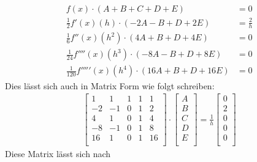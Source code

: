 \begin{equation}
\begin{split}
f(x) \cdot (A + B + C + D + E) & = 0 \\
\frac{1}{2} f'(x)(h) \cdot (-2A - B + D + 2E) &= \frac{2}{h}\\
\frac{1}{6} f''(x)(h^2) \cdot (4A + B + D + 4E) &= 0 \\
\frac{1}{24} f''''(x)(h^3) \cdot (-8A - B + D + 8E) &= 0 \\
\frac{1}{120} f'''''(x)(h^4) \cdot (16A + B + D + 16E) &= 0 
\end{split}
\end{equation}
Dies lässt sich auch in Matrix Form wie folgt schreiben:
\begin{align}
\begin{bmatrix}
1 & 1 & 1 & 1 & 1 \\
-2 & -1 & 0 & 1 & 2 \\
4 & 1 & 0 & 1 & 4 \\
-8 & -1 & 0 & 1 & 8 \\
16 & 1 & 0 & 1 & 16 \\
\end{bmatrix}
\cdot
\begin{bmatrix}
A \\
B \\
C \\
D \\
E \\
\end{bmatrix}
= \frac{1}{h} 
\begin{bmatrix}
0 \\
2 \\
0 \\
0 \\
0 \\
\end{bmatrix}
\end{align}
Diese Matrix lässt sich nach
